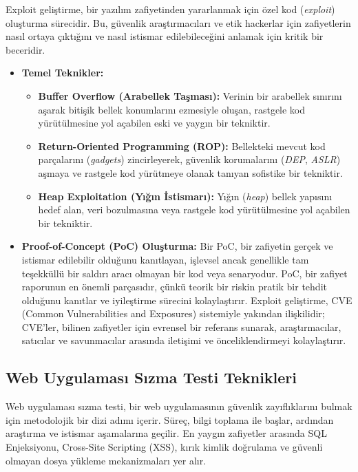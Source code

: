 Exploit geliştirme, bir yazılım zafiyetinden yararlanmak için özel kod (\textit{exploit}) oluşturma sürecidir. Bu, güvenlik araştırmacıları ve etik hackerlar için zafiyetlerin nasıl ortaya çıktığını ve nasıl istismar edilebileceğini anlamak için kritik bir beceridir.

\begin{itemize}
\item \textbf{Temel Teknikler:}
\begin{itemize}
\item \textbf{Buffer Overflow (Arabellek Taşması):} Verinin bir arabellek sınırını aşarak bitişik bellek konumlarını ezmesiyle oluşan, rastgele kod yürütülmesine yol açabilen eski ve yaygın bir tekniktir.
\item \textbf{Return-Oriented Programming (ROP):} Bellekteki mevcut kod parçalarını (\textit{gadgets}) zincirleyerek, güvenlik korumalarını (\textit{DEP}, \textit{ASLR}) aşmaya ve rastgele kod yürütmeye olanak tanıyan sofistike bir tekniktir.
\item \textbf{Heap Exploitation (Yığın İstismarı):} Yığın (\textit{heap}) bellek yapısını hedef alan, veri bozulmasına veya rastgele kod yürütülmesine yol açabilen bir tekniktir.
\end{itemize}
\item \textbf{Proof-of-Concept (PoC) Oluşturma:} Bir PoC, bir zafiyetin gerçek ve istismar edilebilir olduğunu kanıtlayan, işlevsel ancak genellikle tam teşekküllü bir saldırı aracı olmayan bir kod veya senaryodur. PoC, bir zafiyet raporunun en önemli parçasıdır, çünkü teorik bir riskin pratik bir tehdit olduğunu kanıtlar ve iyileştirme sürecini kolaylaştırır. Exploit geliştirme, CVE (Common Vulnerabilities and Exposures) sistemiyle yakından ilişkilidir; CVE'ler, bilinen zafiyetler için evrensel bir referans sunarak, araştırmacılar, satıcılar ve savunmacılar arasında iletişimi ve önceliklendirmeyi kolaylaştırır.
\end{itemize}

\subsection{Web Uygulaması Sızma Testi Teknikleri}

Web uygulaması sızma testi, bir web uygulamasının güvenlik zayıflıklarını bulmak için metodolojik bir dizi adımı içerir. Süreç, bilgi toplama ile başlar, ardından araştırma ve istismar aşamalarına geçilir. En yaygın zafiyetler arasında SQL Enjeksiyonu, Cross-Site Scripting (XSS), kırık kimlik doğrulama ve güvenli olmayan dosya yükleme mekanizmaları yer alır.

